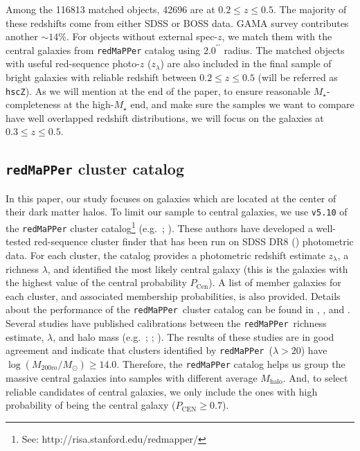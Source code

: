 \documentclass{emulateapj}
\def\arcsec{{\prime\prime}}
\def\redm{\texttt{redMaPPer}}
\def\mstar{{$M_{\star}$}}
\def\mhalo{{$M_{\mathrm{halo}}$}}
\begin{document}
\begin{CJK*}{UTF8}{gbsn}
    Among the 116813 matched objects, 42696 are at $0.2 \leq z \leq 0.5$.
    The majority of these redshifts come from either SDSS or BOSS data.  
    GAMA survey contributes another $\sim 14$\%. 
    For objects without external spec-$z$, we match them with the central galaxies 
    from \redm{} catalog using $2.0^{\arcsec}$ radius. 
    The matched objects with useful red-sequence photo-$z$ ($z_{\lambda}$) are also 
    included in the final sample of bright galaxies with reliable redshift between 
    $0.2 \leq z \leq 0.5$
    (will be referred as \texttt{hscZ}).
    As we will mention at the end of the paper, to ensure reasonable 
    \mstar{}-completeness at the high-\mstar{} end, and make sure the samples we 
    want to compare have well overlapped redshift distributions, we will focus on 
    the galaxies at $0.3 \leq z \leq 0.5$. 

\subsection{\redm{}{} cluster catalog}
    \label{ssec:redmapper}
    
    In this paper, our study focuses on galaxies which are located at the center of
    their dark matter halos. To limit our sample to central galaxies, we use 
    \texttt{v5.10} of the \redm{}{} cluster 
    catalog\footnote{See: http://risa.stanford.edu/redmapper/} 
    (e.g.\ \citealt{Rykoff2014}; \citealt{Rozo2015b}). 
    These authors have developed a well-tested red-sequence cluster finder that has been 
    run on SDSS DR8 (\citealt{SDSSDR8}) photometric data. 
    For each cluster, the catalog provides a photometric redshift estimate $z_{\lambda}$, 
    a richness $\lambda$, and identified the most likely central
    galaxy (this is the galaxies with the highest value of the central probability 
    $P_{\mathrm{Cen}}$). 
    A list of member galaxies for each cluster, and associated membership probabilities, 
    is also provided. 
    Details about the performance of the \redm{}~cluster catalog can be found in 
    \citet{Rozo2014}, \citet{Rozo2015a}, and \citet{Rozo2015b}. 
    Several studies have published calibrations between the \redm{}~richness estimate, 
    $\lambda$, and halo mass (e.g.\ \citealt{Saro2015}; \citealt{Farahi2016}; 
    \citealt{Simet2016}). 
    The results of these studies are in good agreement and indicate that clusters 
    identified by \redm{}~($\lambda > 20$) have $\log (M_{200m}/M_{\odot}) \geq 14.0$. 
    Therefore, the \redm{} catalog helps us group the massive central galaxies into 
    samples with different average \mhalo{}.  
    And, to select reliable candidates of central galaxies, we only include the ones 
    with high probability of being the central galaxy ($P_{\mathrm{CEN}} \geq 0.7$).
       

\end{CJK*}
\end{document}
